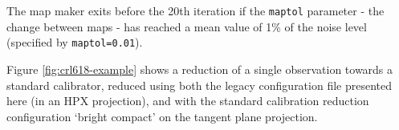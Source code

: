 \documentclass[usenatbib]{mnras}
\newcommand{\note}[1]{\textcolor{red}{Note: #1}}
\begin{document}
The map maker exits before the 20th iteration if the \texttt{maptol}
parameter - the change between maps - has reached a mean value of 1\%
of the noise level (specified by \texttt{maptol=0.01}).






Figure \ref{fig:crl618-example} shows a reduction of a single
observation towards a standard calibrator, reduced using both the
legacy configuration file presented here (in an HPX projection), and
with the standard calibration reduction configuration `bright compact'
on the tangent plane projection.
\end{document}
